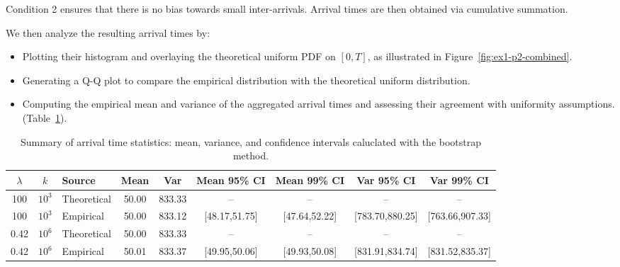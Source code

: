 \documentclass[a4paper]{article}
\begin{document}
Condition 2 ensures that there is no bias towards small inter-arrivals.
Arrival times are then
obtained via cumulative summation.

\noindent
We then analyze the resulting arrival times by:

\begin{itemize}
    \setlength\itemsep{0.01em}
  \item Plotting their histogram and overlaying the theoretical
    uniform PDF on $[0, T]$, as illustrated in Figure~\ref{fig:ex1-p2-combined}.
  \item Generating a Q-Q plot to compare the empirical distribution
    with the theoretical uniform distribution.
  \item Computing the empirical mean and variance of the aggregated
    arrival times and assessing their agreement with uniformity assumptions. (Table~\ref{tab:ex1-p2-ci-summary}).
\end{itemize}

\begin{table}[htbp]
  \centering
  \small
  \begin{tabular}{@{}cc|lcccccc@{}}
    \toprule
    $\lambda$ & $k$ & Source & Mean & Var & Mean 95\% CI & Mean 99\%
    CI & Var 95\% CI & Var 99\% CI \\
    \midrule
    100 & $10^3$ & Theoretical & 50.00 & 833.33 & -- & -- & -- & -- \\
    100 & $10^3$ & Empirical   & 50.00 & 833.12 & [48.17,51.75] &
    [47.64,52.22] & [783.70,880.25] & [763.66,907.33] \\
    \midrule
    0.42 & $10^6$ & Theoretical & 50.00 & 833.33 & -- & -- & -- & -- \\
    0.42 & $10^6$ & Empirical   & 50.01 & 833.37 & [49.95,50.06] &
    [49.93,50.08] & [831.91,834.74] & [831.52,835.37] \\
    \bottomrule
  \end{tabular}
  \caption{Summary of arrival time statistics: mean, variance, and
  confidence intervals caluclated with the bootstrap method.}\label{tab:ex1-p2-ci-summary}
\end{table}
\end{document}
